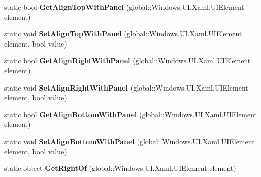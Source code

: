 \begin{DoxyCompactItemize}
\mbox{\label{class_windows_1_1_u_i_1_1_xaml_1_1_controls_1_1_relative_panel_a79e2ec081a759fa726ebcde40fc95107}} 
static bool {\bfseries Get\+Align\+Top\+With\+Panel} (global\+::\+Windows.\+U\+I.\+Xaml.\+U\+I\+Element element)
\item 
\mbox{\label{class_windows_1_1_u_i_1_1_xaml_1_1_controls_1_1_relative_panel_a30dbaee90a5c315837eeaf26f417b320}} 
static void {\bfseries Set\+Align\+Top\+With\+Panel} (global\+::\+Windows.\+U\+I.\+Xaml.\+U\+I\+Element element, bool value)
\item 
\mbox{\label{class_windows_1_1_u_i_1_1_xaml_1_1_controls_1_1_relative_panel_ae3766e96075e9f3f5c1aec5f5d7a97cb}} 
static bool {\bfseries Get\+Align\+Right\+With\+Panel} (global\+::\+Windows.\+U\+I.\+Xaml.\+U\+I\+Element element)
\item 
\mbox{\label{class_windows_1_1_u_i_1_1_xaml_1_1_controls_1_1_relative_panel_ad7c025028b52f2ddf66289f89611fc2d}} 
static void {\bfseries Set\+Align\+Right\+With\+Panel} (global\+::\+Windows.\+U\+I.\+Xaml.\+U\+I\+Element element, bool value)
\item 
\mbox{\label{class_windows_1_1_u_i_1_1_xaml_1_1_controls_1_1_relative_panel_a5e7cb6ab9a90cb2896e3457bc67ca59b}} 
static bool {\bfseries Get\+Align\+Bottom\+With\+Panel} (global\+::\+Windows.\+U\+I.\+Xaml.\+U\+I\+Element element)
\item 
\mbox{\label{class_windows_1_1_u_i_1_1_xaml_1_1_controls_1_1_relative_panel_a52f3e04276443ca31df8ca10c97cfb60}} 
static void {\bfseries Set\+Align\+Bottom\+With\+Panel} (global\+::\+Windows.\+U\+I.\+Xaml.\+U\+I\+Element element, bool value)
\item 
\mbox{\label{class_windows_1_1_u_i_1_1_xaml_1_1_controls_1_1_relative_panel_ad529f58ba41f4e74aaae2ee84288f5d2}} 
static object {\bfseries Get\+Right\+Of} (global\+::\+Windows.\+U\+I.\+Xaml.\+U\+I\+Element element)

\end{DoxyCompactItemize}
